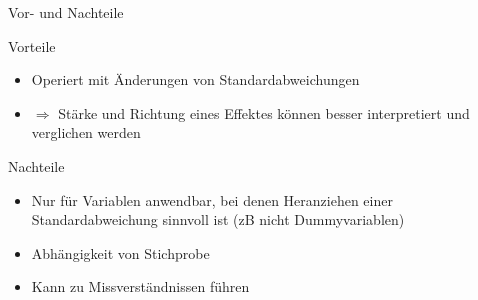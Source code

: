 \documentclass[10pt]{beamer}
\begin{document}
\begin{frame}{Vor- und Nachteile}
	
	\begin{Large}{Vorteile}\end{Large}
	
	\begin{itemize}
		\item Operiert mit Änderungen von Standardabweichungen
		\item $\Rightarrow$ Stärke und Richtung eines Effektes können besser interpretiert und verglichen werden
	\end{itemize}
	
	\begin{Large}{Nachteile}\end{Large}
	
	  \begin{itemize}
		\item Nur für Variablen anwendbar, bei denen Heranziehen einer Standardabweichung sinnvoll ist (zB nicht Dummyvariablen)
		\item Abhängigkeit von Stichprobe
		\item Kann zu Missverständnissen führen
	  \end{itemize}
	
\end{frame}
\end{document}

